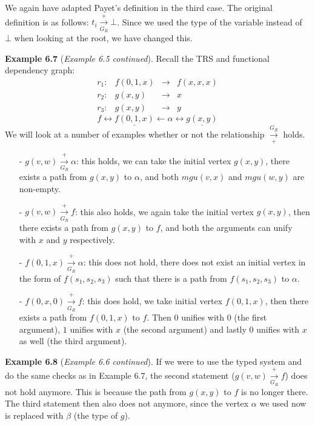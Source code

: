 We again have adapted Payet's definition in the third case. The original definition is as follows: $t_i \xrightarrow[G_R]{+} \bot$. Since we used the type of the variable instead of $\bot$ when looking at the root, we have changed this.

\textbf{Example 6.7} (\textit{Example 6.5 continued}). Recall the TRS and functional dependency graph:
\[
\begin{array}{lrcl}
    r_1: & f(0, 1, x) & \rightarrow & f(x, x, x) \\
    r_2: & g(x, y) & \rightarrow & x \\
    r_3: & g(x, y) & \rightarrow & y
\end{array}
\]
\[
f \longleftrightarrow \underline{f(0, 1, x)} \longleftarrow \alpha \longleftrightarrow \underline{g(x,y)}
\]
We will look at a number of examples whether or not the relationship $\xrightarrow[+]{G_R}$ holds. 
\begin{itemize}
    \itemsep 0em
    \item[-] $g(v, w) \xrightarrow[G_R]{+} \alpha$: this holds, we can take the initial vertex $g(x, y)$, there exists a path from $g(x, y)$ to $\alpha$, and both $\textit{mgu}(v, x)$ and $\textit{mgu}(w, y)$ are non-empty. 
    \item[-] $g(v, w) \xrightarrow[G_R]{+} f$: this also holds, we again take the initial vertex $g(x, y)$, then there exists a path from $g(x, y)$ to $f$, and both the arguments can unify with $x$ and $y$ respectively. 
    \item[-] $f(0, 1, x) \xrightarrow[G_R]{+} \alpha$: this does not hold, there does not exist an initial vertex in the form of $f(s_1, s_2, s_3)$ such that there is a path from $f(s_1, s_2, s_3)$ to $\alpha$.
    \item[-] $f(0, x, 0) \xrightarrow[G_R]{+} f$: this does hold, we take initial vertex $f(0, 1, x)$, then there exists a path from $f(0, 1, x)$ to $f$. Then $0$ unifies with $0$ (the first argument), $1$ unifies with $x$ (the second argument) and lastly $0$ unifies with $x$ as well (the third argument).  
\end{itemize}

\textbf{Example 6.8} (\textit{Example 6.6 continued}). If we were to use the typed system and do the same checks as in Example 6.7, the second statement ($g(v, w) \xrightarrow[G_R]{+} f$) does not hold anymore. This is because the path from $g(x, y)$ to $f$ is no longer there. The third statement then also does not anymore, since the vertex $\alpha$ we used now is replaced with $\beta$ (the type of $g$). 

